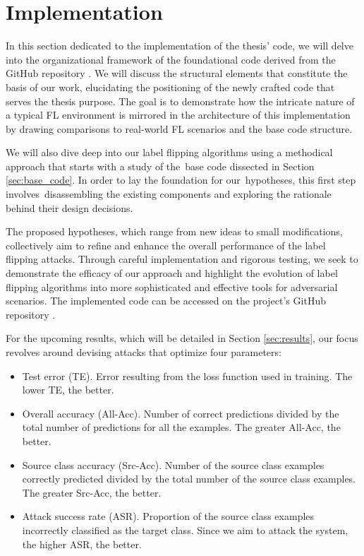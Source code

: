 \section{Implementation}\label{sec:architecture}
In this section dedicated to the implementation of the thesis' code, we will delve into the organizational framework of the foundational code derived from the GitHub repository \cite{LFighter_code}. We will discuss the structural elements that constitute the basis of our work, elucidating the positioning of the newly crafted code that serves the thesis purpose. The goal is to demonstrate how the intricate nature of a typical FL environment is mirrored in the architecture of this implementation by drawing comparisons to real-world FL scenarios and the base code structure.

We will also dive deep into our label flipping algorithms using a methodical approach that starts with a study of the base code dissected in Section \ref{sec:base_code}. In order to lay the foundation for our hypotheses, this first step involves disassembling the existing components and exploring the rationale behind their design decisions.

The proposed hypotheses, which range from new ideas to small modifications, collectively aim to refine and enhance the overall performance of the label flipping attacks. Through careful implementation and rigorous testing, we seek to demonstrate the efficacy of our approach and highlight the evolution of label flipping algorithms into more sophisticated and effective tools for adversarial scenarios. The implemented code can be accessed on the project's GitHub repository \cite{MastersThesisCode}.

For the upcoming results, which will be detailed in Section \ref{sec:results}, our focus revolves around devising attacks that optimize four parameters:
\begin{itemize}
        \item Test error (TE). Error resulting from the loss function used in training. The lower TE, the better.
        \item Overall accuracy (All-Acc). Number of correct predictions divided by the total number of predictions for all the examples. The greater All-Acc, the better.
        \item Source class accuracy (Src-Acc). Number of the source class examples correctly predicted divided by the total number of the source class examples. The greater Src-Acc, the better.
        \item Attack success rate (ASR). Proportion of the source class examples incorrectly classified as the target class. Since we aim to attack the system, the higher ASR, the better.
\end{itemize}

